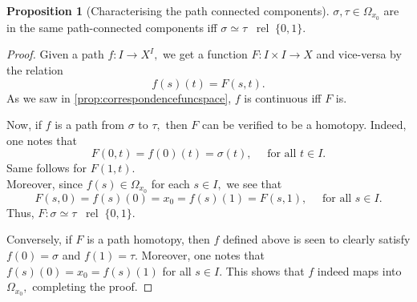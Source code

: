 \documentclass[12pt]{article}
\theoremstyle{definition}
\numberwithin{thm}{section}
\newtheorem{prop}[thm]{Proposition}
\newcommand{\rel}{\;\;\operatorname{rel}\;}
\begin{document}
\begin{prop}[Characterising the path connected components]
	$\sigma, \tau \in \Omega_{x_0}$ are in the same path-connected components iff $\sigma \simeq \tau \rel \{0, 1\}.$
\end{prop}
\begin{proof} 
	Given a path $f:I\to X^I,$ we get a function $F:I\times I \to X$ and vice-versa by the relation
	\begin{equation*} 
		f(s)(t) = F(s, t).
	\end{equation*}
	As we saw in \cref{prop:correspondencefuncspace}, $f$ is continuous iff $F$ is.

	Now, if $f$ is a path from $\sigma$ to $\tau,$ then $F$ can be verified to be a homotopy. Indeed, one notes that
	\begin{equation*} 
		F(0, t) = f(0)(t) = \sigma(t), \quad \text{ for all } t \in I.
	\end{equation*}
	Same follows for $F(1, t).$\\
	Moreover, since $f(s) \in \Omega_{x_0}$ for each $s \in I,$ we see that
	\begin{equation*} 
		F(s, 0) = f(s)(0) = x_0 = f(s)(1) = F(s, 1), \quad \text{ for all } s \in I.
	\end{equation*}
	Thus, $F:\sigma\simeq\tau\rel\{0, 1\}.$

	Conversely, if $F$ is a path homotopy, then $f$ defined above is seen to clearly satisfy $f(0) = \sigma$ and $f(1) = \tau.$ Moreover, one notes that $f(s)(0) = x_0 = f(s)(1)$ for all $s \in I.$ This shows that $f$ indeed maps into $\Omega_{x_0},$ completing the proof.
\end{proof}
\end{document}
